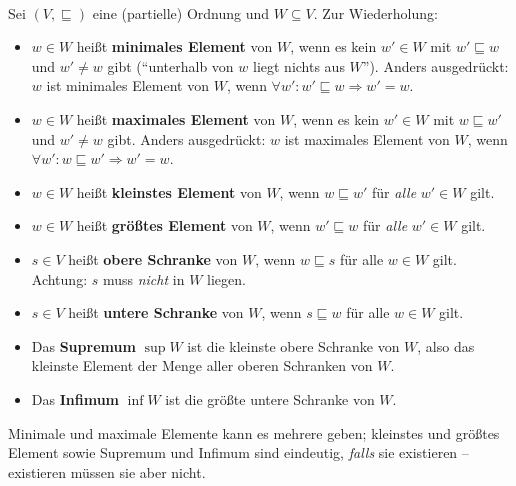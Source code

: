 \newcommand{\printpraesenzlsg}{false}
\newcommand{\printloesungen}{true}
\newcommand{\printbewertungen}{false}
\newcommand{\blattnummer}{2}



\iforiginal{}

	
\\
Sei $(V,\sqsubseteq)$ eine (partielle) Ordnung und $W\subseteq V$. Zur Wiederholung:

\begin{notes}\small
\begin{itemize}
  \item $w\in W$ heißt \textbf{minimales Element} von $W$, wenn es kein $w'\in W$ mit $w'\sqsubseteq w$ und $w'\neq w$ gibt (\enquote{unterhalb von $w$ liegt nichts aus $W$}). Anders ausgedrückt: $w$ ist minimales Element von $W$, wenn $\forall w':w'\sqsubseteq w \Rightarrow w'=w$.
  \item $w\in W$ heißt \textbf{maximales Element} von $W$, wenn es kein $w'\in W$ mit $w\sqsubseteq w'$ und $w'\neq w$ gibt. Anders ausgedrückt: $w$ ist maximales Element von $W$, wenn $\forall w':w\sqsubseteq w' \Rightarrow w'=w$.
  \item $w\in W$ heißt \textbf{kleinstes Element} von $W$, wenn $w\sqsubseteq w'$ für \emph{alle} $w'\in W$ gilt.
  \item $w\in W$ heißt \textbf{größtes Element} von $W$, wenn $w'\sqsubseteq w$ für \emph{alle} $w'\in W$ gilt.
  \item $s\in V$ heißt \textbf{obere Schranke} von $W$, wenn $w\sqsubseteq s$ für alle $w\in W$ gilt. Achtung: $s$ muss \emph{nicht} in $W$ liegen.
  \item $s\in V$ heißt \textbf{untere Schranke} von $W$, wenn $s\sqsubseteq w$ für alle $w\in W$ gilt.
  \item Das \textbf{Supremum} $\sup W$ ist die kleinste obere Schranke von $W$, also das kleinste Element der Menge aller oberen Schranken von $W$.
  \item Das \textbf{Infimum} $\inf W$ ist die größte untere Schranke von $W$.
\end{itemize}
Minimale und maximale Elemente kann es mehrere geben; kleinstes und größtes Element sowie Supremum und Infimum sind eindeutig, \emph{falls} sie existieren -- existieren müssen sie aber nicht.
\end{notes}

